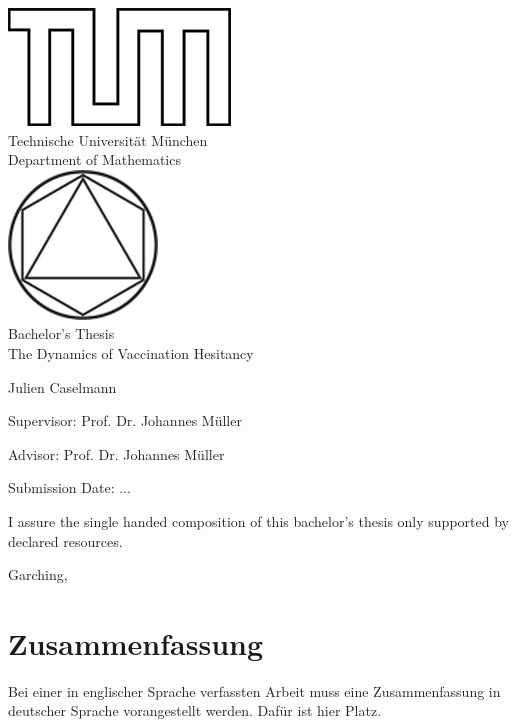 \documentclass[12pt,a4paper,twoside]{article}
\begin{document}
\pagestyle{empty}
\begin{titlepage}
\begin{center}
\includegraphics{img/TUMlblack.png}\\[3mm]
\sf
{\Large
  Technische Universit\"at M\"unchen\\[5mm]
  Department of Mathematics\\[8mm]
}
\normalsize
\includegraphics{img/TUMlMblack.png}\\[15mm]

Bachelor's Thesis\\[15mm]

{\Huge
  The Dynamics of Vaccination Hesitancy
}
\bigskip

\normalsize

Julien Caselmann
\end{center}
\vspace*{75mm}

Supervisor: Prof. Dr. Johannes M\"uller
\medskip

Advisor: Prof. Dr. Johannes M\"uller
\medskip

Submission Date: ...

\end{titlepage}

\vspace*{150mm}

I assure the single handed composition of this bachelor's thesis only supported by declared resources.
\bigskip

Garching,
\newpage
\section*{Zusammenfassung}
Bei einer in englischer Sprache verfassten Arbeit muss eine Zusammenfassung in deutscher Sprache vorangestellt werden.
Daf\"ur ist hier Platz.
\end{document}
